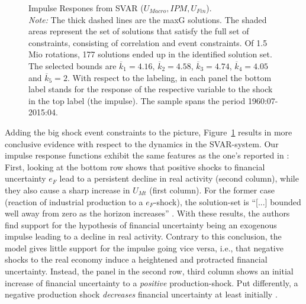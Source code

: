 \documentclass[a4paper,11pt,listof=nochaptergap,oneside,pointednumbers,bibtotoc,bigheadings,liststotoc,hidelinks]{scrbook}
\theoremstyle{mysatz}
\theoremstyle{mydefinition}
\theoremstyle{mytheorem}
\theoremstyle{mybemerkung}
\begin{document}
\begin{figure}[!h]
   \centering
   \setlength\fboxsep{0pt}
   \setlength\fboxrule{0pt}
      \caption[Impulse Respones from SVAR ($U_{Macro}, IPM, U_{Fin}$).]{Impulse Respones from SVAR ($U_{Macro}, IPM, U_{Fin}$).\\
      \textit{Note:}  The thick dashed lines are the maxG solutions. The shaded areas represent the set of solutions that satisfy the full set of constraints, consisting of correlation and event constraints. Of 1.5 Mio rotations, 177 solutions ended up in the identified solution set. The selected bounds are $\overline{k}_1 = 4.16$, $\overline{k}_2 = 4.58$, $\overline{k}_3 = 4.74$, $\overline{k}_4 = 4.05$ and $\overline{k}_5 = 2$. With respect to the labeling, in each panel the bottom label stands for the response of the respective variable to the shock in the top label (the impulse). The sample spans the period 1960:07-2015:04.}   \label{fig:impulse.responses_all.SVAR}
\end{figure}

Adding the big shock event constraints to the picture, Figure~\ref{fig:impulse.responses_all.SVAR} results in more conclusive evidence with respect to the dynamics in the SVAR-system. Our impulse response functions exhibit the same features as the one's reported in \citet{ludvigsonetal:19}: First, looking at the bottom row shows that positive shocks to financial uncertainty $e_F$ lead to a persistent decline in real activity (second column), while they also cause a sharp increase in $U_{Mt}$ (first column). For the former case (reaction of industrial production to a $e_F$-shock), the solution-set is ``[...] bounded well away from zero as the horizon increases'' \citep[p. 22]{ludvigsonetal:19}. With these results, the authors find support for the hypothesis of financial uncertainty being an exogenous impulse leading to a decline in real activity. Contrary to this conclusion, the model gives little support for the impulse going vice versa, i.e., that negative shocks to the real economy induce a heightened and protracted financial uncertainty. Instead, the panel in the second row, third column shows an initial increase of financial uncertainty to a \textit{positive} production-shock. Put differently, a negative production shock \textit{decreases} financial uncertainty at least initially \citep{ludvigsonetal:19}.
\end{document}
